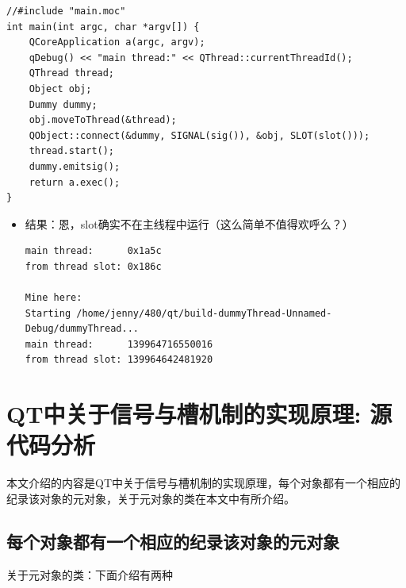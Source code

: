 \documentclass[9pt,b5paper]{article}
\begin{document}
\begin{itemize}
\begin{itemize}
\begin{lstlisting}
//#include "main.moc"
int main(int argc, char *argv[]) {      
    QCoreApplication a(argc, argv);       
    qDebug() << "main thread:" << QThread::currentThreadId();      
    QThread thread;       
    Object obj;       
    Dummy dummy;       
    obj.moveToThread(&thread);      
    QObject::connect(&dummy, SIGNAL(sig()), &obj, SLOT(slot()));      
    thread.start();       
    dummy.emitsig();       
    return a.exec();
}
\end{lstlisting}
\begin{itemize}
\item 结果：恩，slot确实不在主线程中运行（这么简单不值得欢呼么？）

\lstset{language=java,label= ,caption= ,numbers=none}
\begin{lstlisting}
main thread:      0x1a5c
from thread slot: 0x186c 

Mine here: 
Starting /home/jenny/480/qt/build-dummyThread-Unnamed-Debug/dummyThread...
main thread:      139964716550016 
from thread slot: 139964642481920
\end{lstlisting}
\end{itemize}
\end{itemize}
\end{itemize}

\section{QT中关于信号与槽机制的实现原理: 源代码分析}
\label{sec-4}
本文介绍的内容是QT中关于信号与槽机制的实现原理，每个对象都有一个相应的纪录该对象的元对象，关于元对象的类在本文中有所介绍。
\subsection{每个对象都有一个相应的纪录该对象的元对象}
\label{sec-4-1}
关于元对象的类：下面介绍有两种
\end{document}
